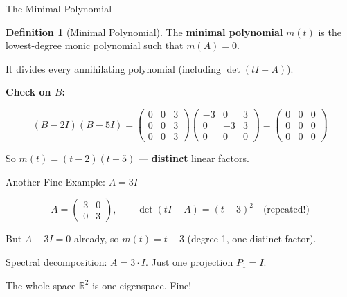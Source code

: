 \documentclass[10pt]{beamer}
\theoremstyle{definition}
\newtheorem{defi}{Definition}[section]
\newcommand{\x}[1]{\alert{\textbf{#1}}}
\begin{document}
\begin{frame}{The Minimal Polynomial}

\begin{defi}[Minimal Polynomial]
The \x{minimal polynomial} $m(t)$ is the lowest-degree monic polynomial such that $m(A) = 0$.
\end{defi}

\vfill

It divides every annihilating polynomial (including $\det(tI - A)$).

\vfill\pause

\x{Check on $B$:}

$$(B - 2I)(B - 5I) = \begin{pmatrix}0&0&3\\0&0&3\\0&0&3\end{pmatrix}\begin{pmatrix}-3&0&3\\0&-3&3\\0&0&0\end{pmatrix} = \begin{pmatrix}0&0&0\\0&0&0\\0&0&0\end{pmatrix}$$

\vfill

So $m(t) = (t-2)(t-5)$ --- \x{distinct} linear factors. \;\checkmark

\end{frame}


\begin{frame}{Another Fine Example: $A = 3I$}

$$A = \begin{pmatrix}3&0\\0&3\end{pmatrix}, \qquad \det(tI - A) = (t-3)^2 \quad\text{(repeated!)}$$

\vfill

But $A - 3I = 0$ already, so $m(t) = t - 3$ \quad (degree 1, one distinct factor).

\vfill

Spectral decomposition: $A = 3 \cdot I$. Just one projection $P_1 = I$.

\vfill

The whole space $\mathbb{R}^2$ is one eigenspace. \quad Fine!

\end{frame}
\end{document}
